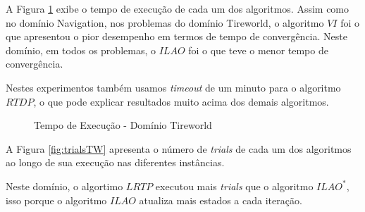 A Figura \ref{fig:timeTW} exibe o tempo de execução de cada um dos algoritmos. Assim como no domínio Navigation, nos problemas do domínio Tireworld, o algoritmo $VI$ foi o que apresentou o pior desempenho em termos de tempo de convergência. Neste domínio, em todos os problemas, o $ILAO$ foi o que teve o menor tempo de convergência.

Nestes experimentos também usamos \textit{timeout} de um minuto para o algoritmo $RTDP$, o que pode explicar resultados muito acima dos demais algoritmos.

\begin{figure}[H]
\centering
{}
\caption{Tempo de Execução - Domínio Tireworld}
\label{fig:timeTW}
\end{figure}


A Figura \ref{fig:trialsTW} apresenta o número de \textit{trials} de cada um dos algoritmos ao longo de sua execução nas diferentes instâncias.

Neste domínio, o algortimo $LRTP$ executou mais \textit{trials} que o algoritmo $ILAO^*$, isso porque o algoritmo $ILAO$ atualiza mais estados a cada iteração. 


